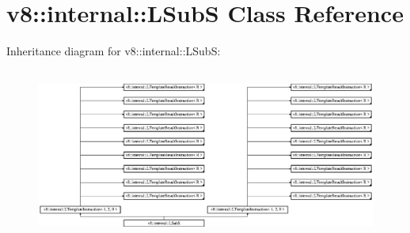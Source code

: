 \hypertarget{classv8_1_1internal_1_1_l_sub_s}{}\section{v8\+:\+:internal\+:\+:L\+SubS Class Reference}
\label{classv8_1_1internal_1_1_l_sub_s}
Inheritance diagram for v8\+:\+:internal\+:\+:L\+SubS\+:\begin{figure}[H]
\begin{center}
\leavevmode
\includegraphics[height=5.724907cm]{classv8_1_1internal_1_1_l_sub_s}
\end{center}
\end{figure}

